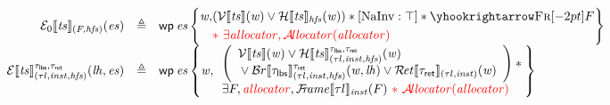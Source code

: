 \documentclass{standalone}
\begin{document}
\flushleft

 \hspace{1em} 
\[
\begin{array}{rcl}
%
  \Evalidaux \llbracket \V{ts} \rrbracket_{(F,\V{hfs})}(\V{es}) & \triangleq & \wpre{\V{es}}{\begin{aligned} \V{w}, & (\Vvalid \llbracket \V{ts} \rrbracket(\V{w}) \vee \Hvalid \llbracket \V{ts} \rrbracket_{\V{hfs}}(\V{w})) \ast{} \NaTok{\top} \ast {\frameR{F}} \\ & \rr{\ast{}~ \exists\V{allocator}, \Avalid(\V{allocator})} \end{aligned} } \\[.5em]
  \Evalid \llbracket \V{ts} \rrbracket_{(\tau l, \V{inst},\V{hfs})}^{\tau_{\K{lbs}},\tau_{\K{ret}}}(\V{lh}, \V{es}) & \triangleq & \wpre{\V{es}}{\V{w},
  \begin{array}{l@{}}
    \left(
    \begin{array}{l}
      \Vvalid \llbracket \V{ts} \rrbracket(\V{w})
      \vee \Hvalid \llbracket \V{ts} \rrbracket_{(\tau l, \V{inst},\V{hfs})}^{\tau_{\K{lbs}},\tau_{\K{ret}}}(\V{w})
    \\
      {} \vee \BRvalid \llbracket \tau_{\K{lbs}} \rrbracket^{\tau_{\K{ret}}}_{(\tau l, \V{inst}, \V{hfs})}(\V{w},\V{lh}) \vee
                                                                                                                 \Rvalid \llbracket \tau_{\K{ret}} \rrbracket_{(\tau l, \V{inst})}(\V{w})
    \end{array}
    \right) \ast {}
  \\
    \exists F, \rr{\V{allocator}}, \FRvalid\llbracket \tau l \rrbracket_{\V{inst}}(F) \rr{~\ast{}~ \Avalid(\V{allocator})}
  \end{array} }
%
\end{array}
\]
\end{document}
